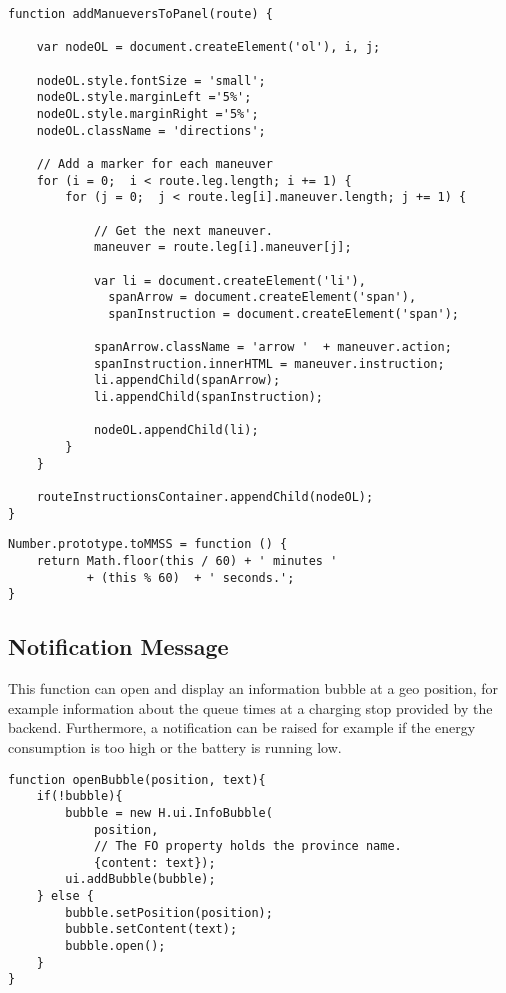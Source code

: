 \begin{verbatim}
function addManueversToPanel(route) {

    var nodeOL = document.createElement('ol'), i, j;

    nodeOL.style.fontSize = 'small';
    nodeOL.style.marginLeft ='5%';
    nodeOL.style.marginRight ='5%';
    nodeOL.className = 'directions';

    // Add a marker for each maneuver
    for (i = 0;  i < route.leg.length; i += 1) {
        for (j = 0;  j < route.leg[i].maneuver.length; j += 1) {

            // Get the next maneuver.
            maneuver = route.leg[i].maneuver[j];

            var li = document.createElement('li'),
              spanArrow = document.createElement('span'),
              spanInstruction = document.createElement('span');

            spanArrow.className = 'arrow '  + maneuver.action;
            spanInstruction.innerHTML = maneuver.instruction;
            li.appendChild(spanArrow);
            li.appendChild(spanInstruction);

            nodeOL.appendChild(li);
        }
    }

    routeInstructionsContainer.appendChild(nodeOL);
}
\end{verbatim}

\begin{verbatim}
Number.prototype.toMMSS = function () {
    return Math.floor(this / 60) + ' minutes '
           + (this % 60)  + ' seconds.';
}
\end{verbatim}


\subsection{Notification Message}

This function can open and display an information bubble at a geo position, for example information about the queue times at a charging stop provided by the backend. Furthermore, a notification can be raised for example if the energy consumption is too high or the battery is running low. 

\begin{verbatim}
function openBubble(position, text){
    if(!bubble){
        bubble = new H.ui.InfoBubble(
            position,
            // The FO property holds the province name.
            {content: text});
        ui.addBubble(bubble);
    } else {
        bubble.setPosition(position);
        bubble.setContent(text);
        bubble.open();
    }
}
\end{verbatim}

